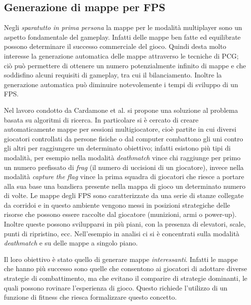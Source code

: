\documentclass[12pt, italian]{toptesi}
\begin{document}
\subsection{Generazione di mappe per FPS}
Negli \emph{sparatutto in prima persona} la mappe per le modalità multiplayer sono un aspetto fondamentale del gameplay.
Infatti delle mappe ben fatte ed equilibrate possono determinare il successo commerciale del gioco.
Quindi desta molto interesse la generazione automatica delle mappe attraverso le tecniche di PCG; ciò può permettere di ottenere un numero potenzialmente infinito di mappe e che soddisfino alcuni requisiti di gameplay, tra cui il bilanciamento.
Inoltre la generazione automatica può diminuire notevolemente i tempi di sviluppo di un FPS.

Nel lavoro condotto da Cardamone et al.\cite{fpsmaps:article} si propone una soluzione al problema basata su algoritmi di ricerca. 
In particolare si è cercato di creare automaticamente mappe per sessioni multigiocatore, cioè partite in cui diversi giocatori controllati da persone fisiche o dal computer 
combattono gli uni contro gli altri per raggiungere un determinato obiettivo; infatti esistono più tipi di modalità, per esempio nella modalità \emph{deathmatch} vince chi raggiunge per primo un numero prefissato di \emph{frag} (il numero di uccisioni di un giocatore), invece nella modalità \emph{capture the flag} vince la prima squadra di giocatori che riesce a portare alla sua base una bandiera presente nella mappa di gioco un determinato numero di volte.
Le mappe degli FPS sono caratterizzate da una serie di stanze collegate da corridoi e in questo ambiente vengono messi in posizioni strategiche delle risorse che possono essere raccolte dal giocatore (munizioni, armi o power-up). Inoltre queste possono svilupparsi in più piani, con la presenza di elevatori, scale, punti di ripristino, ecc.
Nell'esempio in analisi ci si è concentrati sulla modalità \emph{deathmatch} e su delle mappe a singolo piano.

Il loro obiettivo è stato quello di generare mappe \emph{interessanti}. Infatti le mappe che hanno più successo sono quelle che consentono ai giocatori di adottare diverse strategie di combattimento, ma che evitano il comparire di strategie dominanti, le quali possono rovinare l'esperienza di gioco.
Questo richiede l'utilizzo di un funzione di fitness che riesca formalizzare questo concetto.
\end{document}
